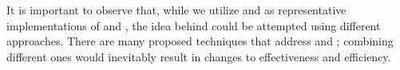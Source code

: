 

It is important to observe that, while we utilize \ek and \fs as representative implementations of \tcs and \tcp, the idea behind \fz could be attempted using different approaches.
There are many proposed techniques that address \tcs and \tcp; combining different ones would inevitably result in changes to effectiveness and efficiency.
